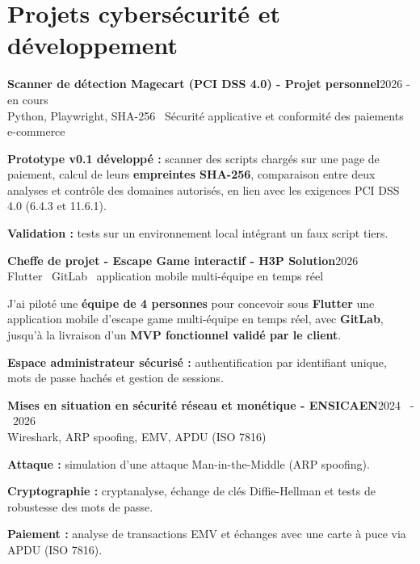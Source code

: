 \documentclass[10pt,a4paper]{article}
\newcommand{\role}[3]{\textbf{\color{ink}#1}\hfill {\color{muted}\footnotesize #2}\\[-1pt]{\color{muted}\footnotesize #3}\par\vspace{3pt}}
\newcommand{\sm}[1]{{\fontsize{8.5}{10.2}\selectfont #1}}
\begin{document}
\section{Projets cybersécurité et développement}
\role{Scanner de détection Magecart (PCI DSS 4.0) \textnormal{- Projet personnel}}{2026  -  en cours}{Python, Playwright, SHA-256 \textbar\ Sécurité applicative et conformité des paiements e-commerce}
\begin{itemize}\sm{
\item \textbf{Prototype v0.1 développé :} scanner des scripts chargés sur une page de paiement, calcul de leurs \textbf{empreintes SHA-256}, comparaison entre deux analyses et contrôle des domaines autorisés, en lien avec les exigences PCI DSS 4.0 (6.4.3 et 11.6.1).
\item \textbf{Validation :} tests sur un environnement local intégrant un faux script tiers.
}\end{itemize}
\vspace{0pt}
\role{Cheffe de projet - Escape Game interactif \textnormal{- H3P Solution}}{2026}{Flutter \textbar\ GitLab \textbar\ application mobile multi-équipe en temps réel}
\begin{itemize}\sm{
\item J'ai piloté une \textbf{équipe de 4 personnes} pour concevoir sous \textbf{Flutter} une application mobile d'escape game multi-équipe en temps réel, avec \textbf{GitLab}, jusqu'à la livraison d'un \textbf{MVP fonctionnel validé par le client}.
\item \textbf{Espace administrateur sécurisé :} authentification par identifiant unique, mots de passe hachés et gestion de sessions.
}\end{itemize}
\vspace{4pt}
\role{Mises en situation en sécurité réseau et monétique \textnormal{- ENSICAEN}}{2024 \ - \ 2026}{Wireshark, ARP spoofing, EMV, APDU (ISO 7816)}
\begin{itemize}\sm{
\item \textbf{Attaque :} simulation d'une attaque Man-in-the-Middle (ARP spoofing).
\item \textbf{Cryptographie :} cryptanalyse, échange de clés Diffie-Hellman et tests de robustesse des mots de passe.
\item \textbf{Paiement :} analyse de transactions EMV et échanges avec une carte à puce via APDU (ISO 7816).
}\end{itemize}
\end{document}
